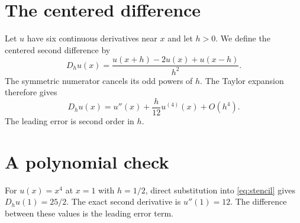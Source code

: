 \section{The centered difference}
Let $u$ have six continuous derivatives near $x$ and let $h>0$.
We define the centered second difference by
\begin{equation}\label{eq:stencil}
 D_h u(x)=\frac{u(x+h)-2u(x)+u(x-h)}{h^2}.
\end{equation}
The symmetric numerator cancels its odd powers of $h$.
The Taylor expansion therefore gives
\begin{equation}\label{eq:error}
 D_h u(x)=u''(x)+\frac{h}{12}u^{(4)}(x)+O(h^4).
\end{equation}
The leading error is second order in $h$.

\section{A polynomial check}
For $u(x)=x^4$ at $x=1$ with $h=1/2$, direct substitution into
\eqref{eq:stencil} gives $D_hu(1)=25/2$.
The exact second derivative is $u''(1)=12$.
The difference between these values is the leading error term.
